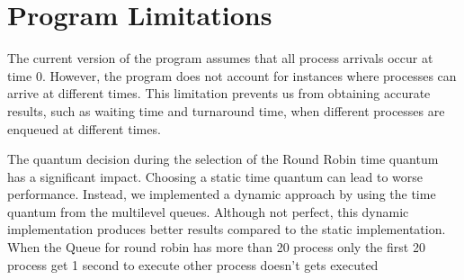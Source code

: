 \documentclass{article}
\begin{document}
\section{Program Limitations}
The current version of the program assumes that all process arrivals occur at time 0. However, the program does not account for instances where processes can arrive at different times. This limitation prevents us from obtaining accurate results, such as waiting time and turnaround time, when different processes are enqueued at different times.

The quantum decision during the selection of the Round Robin time quantum has a significant impact. Choosing a static time quantum can lead to worse performance. Instead, we implemented a dynamic approach by using the time quantum from the multilevel queues. Although not perfect, this dynamic implementation produces better results compared to the static implementation.
When the Queue for round robin has more than 20 process only the first 20 process get 1 second to execute other process doesn't gets executed
\end{document}
